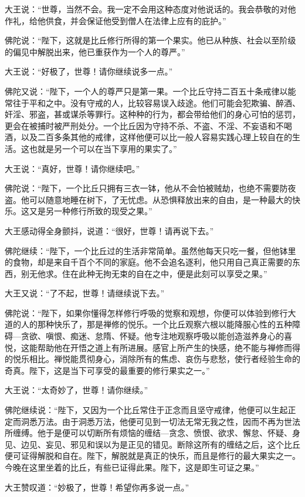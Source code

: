 \documentclass[12pt,twoside,openany]{book}
\begin{document}
大王说：“世尊，当然不会。我一定不会用这种态度对他说话的。我会恭敬的对他作礼，给他供食，并会保证他受到僧人在法律上应有的庇护。”

佛陀说：“陛下，这就是比丘修行所得的第一个果实。他已从种族、社会以至阶级的偏见中解脱出来，他已重获作为一个人的尊严。”

大王说：“好极了，世尊！请你继续说多一点。”

佛陀又说：“陛下，一个人的尊严只是第一果。一个比丘守持二百五十条戒律以能常往于平和之中。没有守戒的人，比较容易误入歧途。他们可能会犯欺骗、醉酒、奸淫、邪盗，甚或谋杀等罪行。这种种的行为，都会带给他们的身心可怕的惩罚，更会在被捕时被严刑处分。一个比丘因为守持不杀、不盗、不淫、不妄语和不喝酒，以及二百多条其他的戒律，这样他便可以比一般人容易实践心理上较自在的生活。这也就是另一个可以在当下享用的果实了。”

大王说：“真好，世尊！请你继续吧。”

佛陀说：“陛下，一个比丘只拥有三衣一钵，他从不会怕被贼劫，也绝不需要防夜盗。他可以随意地睡在树下，了无忧虑。从恐惧释放出来的自由，是一种最大的快乐。这又是另一种修行所致的现受之果。”

大王感动得全身颤抖，说道：“很好，世尊！请再说下去。”

佛陀继续：“陛下，一个比丘过的生活非常简单。虽然他每天只吃一餐，但他钵里的食物，却是来自千百个不同的家庭。他不会追名逐利，他只用自己真正需要的东西，别无他求。住在此种无拘无束的自在之中，便是此刻可以享受之果。”

大王又说：“了不起，世尊！请继续说下去。”

佛陀说：“陛下，如果你懂得怎样修行呼吸的觉察和观想，你便可以体验到修行大道的人的那种快乐了，那是禅修的悦乐。一个比丘观察六根以能降服心性的五种障碍---贪欲、嗔恨、痴迷、怠隋、怀疑。他专注地观察呼吸以能创造滋养身心的喜悦，这能帮助他在开悟之道上有所进展。感官上所产生的快感，绝不能与禅修而得的悦乐相比。禅悦能贯彻身心，消除所有的焦虑、哀伤与悲愁，使行者经验生命的奇真。陛下，这是当下可享受的最重要的修行果实之一。”

大王说：“太奇妙了，世尊！请你继续。”

佛陀继续说：“陛下，又因为一个比丘常住于正念而且坚守戒律，他便可以生起正定而洞悉万法。由于洞悉万法，他便可见到一切法无常无我之性，因而不再为世法所缠缚。他于是便可以切断所有烦恼的缠结---贪念、愤恨、欲求、懈怠、怀疑、身见、边见、妄见、邪见和误以为是正见的错见。断除这所有的缠结之后，这个比丘便可证得解脱和自在。陛下，解脱就是真正的快乐，而且是修行的最大果实之一。今晚在这里坐着的比丘，有些已证得此果。陛下，这是即生可证之果。”

大王赞叹道：“妙极了，世尊！希望你再多说一点。”
\end{document}
